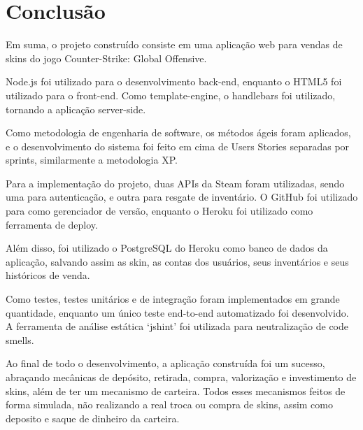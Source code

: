\chapter*[Conclusão]{Conclusão}
Em suma, o projeto construído consiste em uma aplicação web para vendas de skins do jogo 
Counter-Strike: Global Offensive.

Node.js foi utilizado para o desenvolvimento back-end,
enquanto o HTML5 foi utilizado para o front-end. Como template-engine, o handlebars foi 
utilizado, tornando a aplicação server-side.

Como metodologia de engenharia de software, os métodos ágeis foram aplicados, e o 
desenvolvimento do sistema foi feito em cima de Users Stories separadas por sprints, 
similarmente a metodologia XP.  

Para a implementação do projeto, duas APIs da Steam foram utilizadas, sendo uma para 
autenticação, e outra para resgate de inventário. O GitHub foi utilizado para como 
gerenciador de versão, enquanto o Heroku foi utilizado como ferramenta de deploy.

Além disso, foi utilizado o PostgreSQL do Heroku como banco de dados da aplicação, salvando 
assim as skin, as contas dos usuários, seus inventários e seus históricos de venda.

Como testes, testes unitários e de integração foram implementados em grande quantidade, 
enquanto um único teste end-to-end automatizado foi desenvolvido. A ferramenta de análise 
estática ‘jshint’ foi utilizada para neutralização de code smells.

Ao final de todo o desenvolvimento, a aplicação construída foi um sucesso, abraçando 
mecânicas de depósito, retirada, compra, valorização e investimento de skins, além de ter um 
mecanismo de carteira. Todos esses mecanismos feitos de forma simulada, não realizando a 
real troca ou compra de skins, assim como deposito e saque de dinheiro da carteira.

